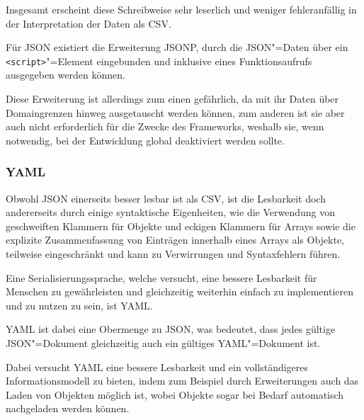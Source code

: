                 Insgesamt erscheint diese Schreibweise sehr leserlich und
                weniger fehleranfällig in der Interpretation der Daten als
                \gls{CSV}.

                Für
                \gls{JSON} existiert die Erweiterung
                \gls{JSONP},
                durch die
                \gls{JSON}"=Daten über ein
                \lstinline{<script>}"=Element eingebunden und
                inklusive eines Funktionsaufrufs ausgegeben werden können.\cite{Ippolito2005}

                Diese Erweiterung ist allerdings zum einen gefährlich,
                da mit ihr Daten über Domaingrenzen hinweg ausgetauscht werden können,
                zum anderen ist sie aber auch nicht erforderlich für die Zwecke des Frameworks,
                weshalb sie,
                wenn notwendig,
                bei der Entwicklung global deaktiviert werden sollte.

            \subsubsection{YAML}\label{YAML}
                Obwohl
                \gls{JSON} einerseits besser lesbar ist als
                \gls{CSV},
                ist die Lesbarkeit doch andererseits durch einige syntaktische Eigenheiten,
                wie die Verwendung von geschweiften Klammern für Objekte und
                eckigen Klammern für Arrays sowie
                die explizite Zusammenfassung von Einträgen innerhalb eines Arrays als Objekte,
                teilweise eingeschränkt und
                kann zu Verwirrungen und Syntaxfehlern führen.

                Eine Serialisierungssprache,
                welche versucht,
                eine bessere Lesbarkeit für Menschen zu gewährleisten und
                gleichzeitig weiterhin einfach zu implementieren und
                zu nutzen zu sein,
                ist
                \gls{YAML}.

                \gls{YAML} ist dabei eine Obermenge zu
                \gls{JSON},
                was bedeutet,
                dass jedes gültige
                \gls{JSON}"=Dokument gleichzeitig auch ein gültiges
                \gls{YAML}"=Dokument ist.\cite{Ben-Kiki2009}

                Dabei versucht
                \gls{YAML} eine bessere Lesbarkeit und
                ein vollständigeres Informationsmodell zu bieten,
                indem zum Beispiel durch Erweiterungen auch das Laden von Objekten möglich ist,
                wobei Objekte sogar bei Bedarf automatisch nachgeladen werden können.

